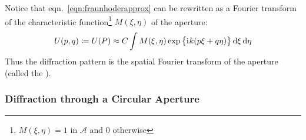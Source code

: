 Notice that eqn.~\eqref{eqn:fraunhoderapprox} can be rewritten as a Fourier transform of the characteristic function\footnote{\(M(\xi, \eta) = 1\) in \(\mathcal{A}\) and 0 otherwise} \(M(\xi, \eta)\) of the aperture:
%
\begin{equation}
    U(p,q) \coloneqq U(P) \approx C \int M(\xi, \eta) \exp\left\{\iu k (p \xi + q \eta ) \right\} \dif \xi \dif \eta
\end{equation}
%
Thus the diffraction pattern is the spatial Fourier transform of the aperture (called the ).

\subsubsection{Diffraction through a Circular Aperture}\label{subsubsec:circularaperture}

